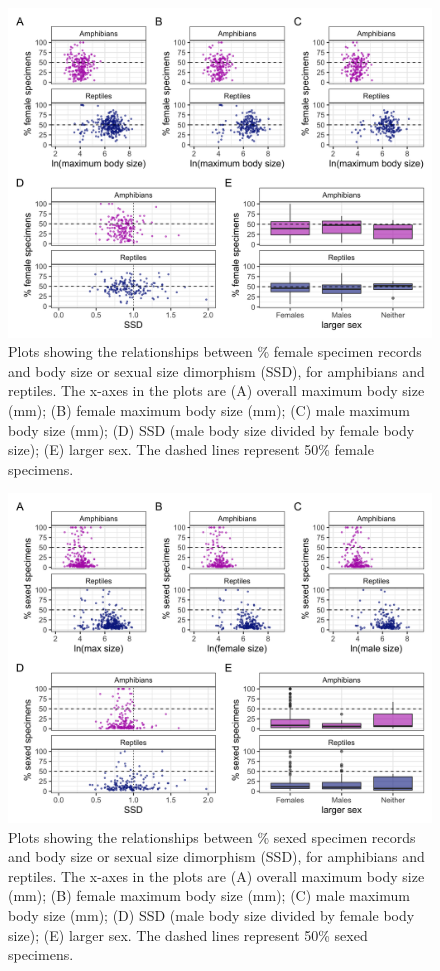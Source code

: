 \documentclass[a4paper, 12pt]{article}
\begin{document}
\newpage
\begin{figure}[h]
 \centering
  \includegraphics[width = \linewidth]{figures/size-combined.png}
  \caption{Plots showing the relationships between \% female specimen records and body size or sexual size dimorphism (SSD), for amphibians and reptiles. The x-axes in the plots are (A) overall maximum body size (mm); (B) female maximum body size (mm); (C) male maximum body size (mm); (D) SSD (male body size divided by female body size); (E) larger sex. The dashed lines represent 50\% female specimens.
}
  \label{fig-ssd-female}
\end{figure}

\newpage
\begin{figure}[h]
 \centering
  \includegraphics[width = \linewidth]{figures/size-combined-unsexed.png}
  \caption{Plots showing the relationships between \% sexed specimen records and body size or sexual size dimorphism (SSD), for amphibians and reptiles. The x-axes in the plots are (A) overall maximum body size (mm); (B) female maximum body size (mm); (C) male maximum body size (mm); (D) SSD (male body size divided by female body size); (E) larger sex. The dashed lines represent 50\% sexed specimens. 
}
  \label{fig-ssd-sex}
\end{figure} 
\end{document}
